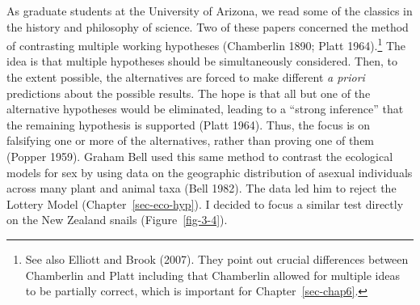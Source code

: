 \documentclass[
  letterpaper,
]{book}
\begin{document}
As graduate students at the University of Arizona, we read some of the
classics in the history and philosophy of science. Two of these papers
concerned the method of contrasting multiple working hypotheses
(Chamberlin 1890; Platt 1964).\footnote{See also Elliott and Brook
  (2007). They point out crucial differences between Chamberlin and
  Platt including that Chamberlin allowed for multiple ideas to be
  partially correct, which is important for Chapter~\ref{sec-chap6}.}
The idea is that multiple hypotheses should be simultaneously
considered. Then, to the extent possible, the alternatives are forced to
make different \emph{a priori} predictions about the possible results.
The hope is that all but one of the alternative hypotheses would be
eliminated, leading to a ``strong inference'' that the remaining
hypothesis is supported (Platt 1964). Thus, the focus is on falsifying
one or more of the alternatives, rather than proving one of them (Popper
1959). Graham Bell used this same method to contrast the ecological
models for sex by using data on the geographic distribution of asexual
individuals across many plant and animal taxa (Bell 1982). The data led
him to reject the Lottery Model (Chapter~\ref{sec-eco-hyp}). I decided
to focus a similar test directly on the New Zealand snails
(Figure~\ref{fig-3-4}).
\end{document}
